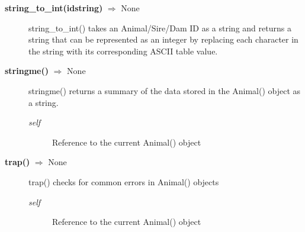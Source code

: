 \begin{description}
\item[\textbf{string\_to\_int(idstring)} $\Rightarrow$ None]
string\_to\_int() takes an Animal/Sire/Dam ID as a string and returns a string that can be represented as an integer by replacing each character in the string with its corresponding ASCII table value.

\item[\textbf{stringme()} $\Rightarrow$ None]
stringme() returns a summary of the data stored in the Animal() object as a string.
\begin{description}
\item[\emph{self}] Reference to the current Animal() object
\end{description}


\item[\textbf{trap()} $\Rightarrow$ None]
trap() checks for common errors in Animal() objects
\begin{description}
\item[\emph{self}] Reference to the current Animal() object
\end{description}

\end{description}

